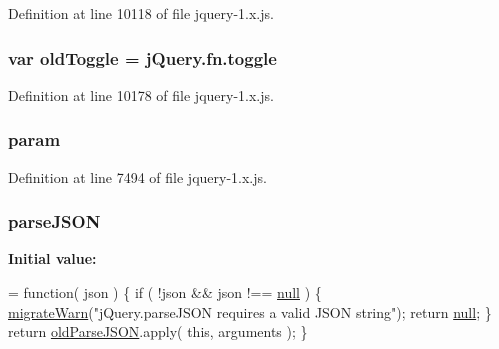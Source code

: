 Definition at line 10118 of file jquery-\/1.\+x.\+js.

\subsubsection[{\texorpdfstring{old\+Toggle}{oldToggle}}]{\setlength{\rightskip}{0pt plus 5cm}var old\+Toggle = {\bf j\+Query.\+fn.\+toggle}}\hypertarget{jquery-1_8x_8js_aa7842699375a00b303040263989263f6}{}\label{jquery-1_8x_8js_aa7842699375a00b303040263989263f6}


Definition at line 10178 of file jquery-\/1.\+x.\+js.

\subsubsection[{\texorpdfstring{param}{param}}]{ param}\hypertarget{jquery-1_8x_8js_a24ced9cd3c9e1970a8cbe8d7adedc765}{}\label{jquery-1_8x_8js_a24ced9cd3c9e1970a8cbe8d7adedc765}


Definition at line 7494 of file jquery-\/1.\+x.\+js.

\subsubsection[{\texorpdfstring{parse\+J\+S\+ON}{parseJSON}}]{ parse\+J\+S\+ON}\hypertarget{jquery-1_8x_8js_a04f5ac130281955d6ed88ad6456a4e15}{}\label{jquery-1_8x_8js_a04f5ac130281955d6ed88ad6456a4e15}
{\bfseries Initial value\+:}
\begin{DoxyCode}
= \textcolor{keyword}{function}( json ) \{
    \textcolor{keywordflow}{if} ( !json && json !== \hyperlink{modernizr_8min_8js_a286f9ec831c5e676eeb493248eab9575}{null} ) \{
        \hyperlink{jquery-1_8x_8js_ac6036b3100bb484f96bfb15165e077f9}{migrateWarn}(\textcolor{stringliteral}{"jQuery.parseJSON requires a valid JSON string"});
        \textcolor{keywordflow}{return} \hyperlink{modernizr_8min_8js_a286f9ec831c5e676eeb493248eab9575}{null};
    \}
    \textcolor{keywordflow}{return} \hyperlink{jquery-1_8x_8js_ad5591e1f43cb452fcb2ad4500ecd21c0}{oldParseJSON}.apply( \textcolor{keyword}{this}, arguments );
\}
\end{DoxyCode}


